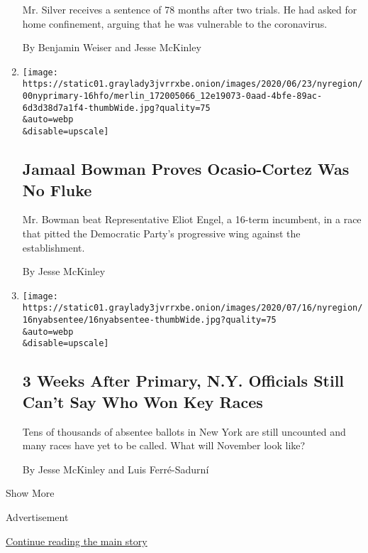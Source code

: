 \begin{enumerate}
  Mr. Silver receives a sentence of 78 months after two trials. He had
  asked for home confinement, arguing that he was vulnerable to the
  coronavirus.

  By Benjamin Weiser and Jesse McKinley
\item
  \href{/2020/07/17/nyregion/jamaal-bowman-eliot-engel.html}{}

  \texttt{[image: https://static01.graylady3jvrrxbe.onion/images/2020/06/23/nyregion/00nyprimary-16hfo/merlin\_172005066\_12e19073-0aad-4bfe-89ac-6d3d38d7a1f4-thumbWide.jpg?quality=75\\\&auto=webp\\\&disable=upscale]}

  \hypertarget{jamaal-bowman-proves-ocasio-cortez-was-no-fluke}{%
  \subsection{Jamaal Bowman Proves Ocasio-Cortez Was No
  Fluke}\label{jamaal-bowman-proves-ocasio-cortez-was-no-fluke}}

  Mr. Bowman beat Representative Eliot Engel, a 16-term incumbent, in a
  race that pitted the Democratic Party's progressive wing against the
  establishment.

  By Jesse McKinley
\item
  \href{/2020/07/17/nyregion/election-absentee-ballots-primary.html}{}

  \texttt{[image: https://static01.graylady3jvrrxbe.onion/images/2020/07/16/nyregion/16nyabsentee/16nyabsentee-thumbWide.jpg?quality=75\\\&auto=webp\\\&disable=upscale]}

  \hypertarget{3-weeks-after-primary-ny-officials-still-cant-say-who-won-key-races}{%
  \subsection{3 Weeks After Primary, N.Y. Officials Still Can't Say Who
  Won Key
  Races}\label{3-weeks-after-primary-ny-officials-still-cant-say-who-won-key-races}}

  Tens of thousands of absentee ballots in New York are still uncounted
  and many races have yet to be called. What will November look like?

  By Jesse McKinley and Luis Ferré-Sadurní
\end{enumerate}

Show More

Advertisement

\protect\hyperlink{after-mid2}{Continue reading the main story}

